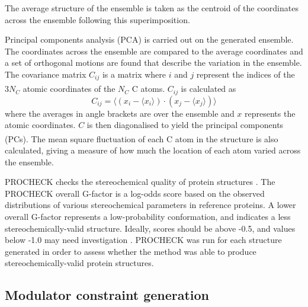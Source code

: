 The average structure of the ensemble is taken as the centroid of the coordinates across the ensemble following this superimposition.

Principal components analysis (PCA) is carried out on the generated ensemble.
The coordinates across the ensemble are compared to the average coordinates and a set of orthogonal motions are found that describe the variation in the ensemble.
The covariance matrix $C_{ij}$ is a matrix where $i$ and $j$ represent the indices of the $3 N_{C}$ atomic coordinates of the $N_{C}$ C\textsuperscript{\textalpha} atoms.
$C_{ij}$ is calculated as
$$
C_{ij} = \langle (x_{i} - \langle x_{i} \rangle) \cdot (x_{j} - \langle x_{j} \rangle) \rangle
$$
where the averages in angle brackets are over the ensemble and $x$ represents the atomic coordinates.
$C$ is then diagonalised to yield the principal components (PCs).
The mean square fluctuation of each C\textsuperscript{\textalpha} atom in the structure is also calculated, giving a measure of how much the location of each atom varied across the ensemble.

PROCHECK checks the stereochemical quality of protein structures \cite{Laskowski1993}.
The PROCHECK overall G-factor is a log-odds score based on the observed distributions of various stereochemical parameters in reference proteins.
A lower overall G-factor represents a low-probability conformation, and indicates a less stereochemically-valid structure.
Ideally, scores should be above -0.5, and values below -1.0 may need investigation \cite{Esposito2006}.
PROCHECK was run for each structure generated in order to assess whether the method was able to produce stereochemically-valid protein structures.


\subsection{Modulator constraint generation}

